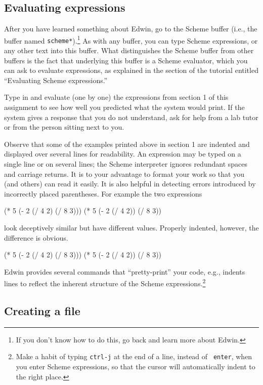 \subsection{Evaluating expressions}

After you have learned something about Edwin, go to the Scheme buffer
(i.e., the buffer named {\tt *scheme*}).\footnote{If you don't know
how to do this, go back and learn more about Edwin.}  As with any
buffer, you can type Scheme expressions, or any other text into this
buffer.  What distinguishes the Scheme buffer from other buffers is
the fact that underlying this buffer is a Scheme evaluator, which you
can ask to evaluate expressions, as explained in the section of the
tutorial entitled ``Evaluating Scheme expressions.''

Type in and evaluate (one by one) the expressions from section 1 of
this assignment to see how well you predicted what the system would
print.  If the system gives a response that you do not understand, ask
for help from a lab tutor or from the person sitting next to you.

Observe that some of the examples printed above in section 1 are
indented and displayed over several lines for readability.  An
expression may be typed on a single line or on several lines; the
Scheme interpreter ignores redundant spaces and carriage returns.  It
is to your advantage to format your work so that you (and others) can
read it easily. It is also helpful in detecting errors introduced by
incorrectly placed parentheses.  For example the two expressions

\beginlisp
(* 5 (- 2 (/ 4 2) (/ 8 3)))
\null
(* 5 (- 2 (/ 4 2)) (/ 8 3))
\endlisp

\noindent
look deceptively similar but have different values. Properly indented,
however, the difference is obvious.

\beginlisp
(* 5
   (- 2
      (/ 4 2)
      (/ 8 3)))
\null
(* 5
   (- 2
      (/ 4 2))
   (/ 8 3))
\endlisp

Edwin provides several commands that ``pretty-print'' your code, e.g.,
indents lines to reflect the inherent structure of the Scheme
expressions.\footnote{Make a
habit of typing {\tt ctrl-j} at the end of a line, instead of {\tt
enter}, when you enter Scheme expressions, so that the cursor will
automatically indent to the right place.}


\subsection{Creating a file}

